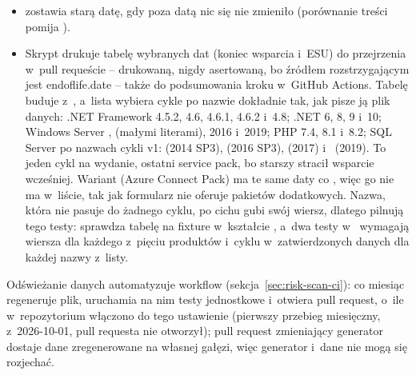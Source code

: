 \begin{itemize}
        i~4.8; .NET 3.1, 6.0 i~8.0; PHP 7.4.0 i~8.2.0; Node.js 14.0.0 i~20.0.0; Angular
        12.0.0; Laravel 8.0.0; Symfony 4.4.0. SQL Server musi mieć cykl 2016, Windows Server
        -- 2012, a~ musi być datą ISO.
  \item {} zostawia starą datę, gdy poza datą nic się nie
        zmieniło (porównanie treści pomija ).
  \item Skrypt drukuje tabelę wybranych dat (koniec wsparcia i~ESU) do przejrzenia w~pull
        requeście -- drukowaną, nigdy asertowaną, bo źródłem rozstrzygającym jest
        endoflife.date -- także do podsumowania kroku w~GitHub Actions. Tabelę buduje
         z~, a~lista
         wybiera cykle po nazwie dokładnie tak, jak pisze ją plik danych:
        .NET Framework 4.5.2, 4.6, 4.6.1, 4.6.2 i~4.8; .NET 6, 8, 9 i~10; Windows Server
        ,  (małymi literami), 2016 i~2019; PHP 7.4, 8.1 i~8.2;
        SQL Server po nazwach cykli v1:  (2014 SP3), 
        (2016 SP3),  (2017) i~ (2019). To jeden cykl na wydanie,
        ostatni service pack, bo starszy stracił wsparcie wcześniej. Wariant
         (Azure Connect Pack) ma te same daty co ,
        więc go nie ma w~liście, tak jak formularz nie oferuje pakietów dodatkowych. Nazwa,
        która nie pasuje do żadnego cyklu, po cichu gubi swój wiersz, dlatego pilnują tego
        testy:  sprawdza tabelę na fixture w~kształcie
        , a~dwa testy w~ wymagają wiersza dla
        każdego z~pięciu produktów i~cyklu w~zatwierdzonych danych dla każdej nazwy z~listy.
\end{itemize}

Odświeżanie danych automatyzuje workflow 
(sekcja~\ref{sec:risk-scan-ci}): co miesiąc regeneruje plik, uruchamia na nim testy
jednostkowe i~otwiera pull request, o~ile w~repozytorium włączono do tego ustawienie (pierwszy
przebieg miesięczny, z~2026-10-01, pull requesta nie otworzył); pull request zmieniający
generator dostaje dane zregenerowane na własnej gałęzi, więc generator i~dane nie mogą się
rozjechać.


